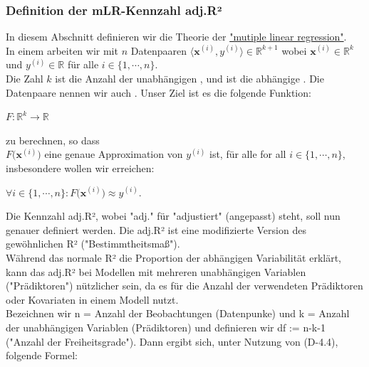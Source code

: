 \documentclass[12pt]{article}
\begin{document}
\subsubsection{Definition der mLR-Kennzahl adj.R²}
%
In diesem Abschnitt definieren wir die Theorie der \href{https://en.wikipedia.org/wiki/Linear_regression}{"mutiple linear regression"}.\\
In einem {\color{blue}{multiplen Regression Problem}} arbeiten wir mit $n$ Datenpaaren $\langle\mathbf{x}^{(i)}, y^{(i)} \rangle \in \mathbb{R}^{k+1} $ 
wobei $\mathbf{x}^{(i)} \in \mathbb{R}^k$ und $y^{(i)} \in \mathbb{R}$ für alle $i \in \{1,\cdots,n\}$.  \\
Die Zahl $k$ ist die Anzahl der unabhängigen { }, und {} ist die abhängige {\color{blue}{Zielvariable ("target column")}}. Die Datenpaare nennen wir auch {\color{blue}{Trainings-Menge}}. Unser Ziel ist es die folgende Funktion:  
\\[0.2cm]
\hspace*{1.3cm}
\begin{large}
$F:\mathbb{R}^k \rightarrow \mathbb{R}$ 
\end{large} 
zu berechnen, so dass 
\\[0.2cm]  
$ F\bigl(\mathbf{x}^{(i)}\bigr)$ eine  genaue Approximation von $y^{(i)}$ ist,  für alle for all $i\in\{1,\cdots,n\}$, insbesondere wollen wir erreichen: \\[0.3cm]
\hspace*{1.3cm}
\begin{large}
$\forall i\in\{1,\cdots,n\}:F\bigl(\mathbf{x}^{(i)}\bigr) \approx y^{(i)}$. \\[0.4cm]
\end{large}
%
Die Kennzahl adj.R², wobei "adj." für "adjustiert" (angepasst) steht, soll nun genauer definiert werden. Die adj.R² ist eine modifizierte Version des gewöhnlichen R² ("Bestimmtheitsmaß").\\
Während das normale R² die Proportion der abhängigen Variabilität erklärt, kann das adj.R² bei Modellen mit mehreren unabhängigen Variablen ("Prädiktoren") nützlicher sein, da es für die Anzahl der verwendeten Prädiktoren oder Kovariaten in einem Modell nutzt.\\
Bezeichnen wir n = Anzahl der Beobachtungen (Datenpunke) und k = Anzahl der unabhängigen Variablen (Prädiktoren) und definieren wir df := n-k-1 ("Anzahl der Freiheitsgrade"). Dann ergibt sich, unter Nutzung von (D-4.4), folgende Formel:\\[0.1cm]
\end{document}
